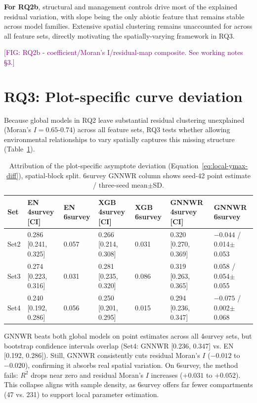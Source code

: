 \documentclass[logo,msc,ai]{infthesis}           %
\newcommand{\fig}[1]{\textcolor{purple}{[FIG: #1]}}
\begin{document}
\textbf{For RQ2b}, structural and management controls drive most of the explained residual variation, with slope being the only abiotic feature that remains stable across model families. Extensive spatial clustering remains unaccounted for across all feature sets, directly motivating the spatially-varying framework in RQ3.

\fig{RQ2b - coefficient/Moran's I/residual-map composite. See working notes \S3.}



\section{RQ3: Plot-specific curve deviation}

Because global models in RQ2 leave substantial residual clustering unexplained (Moran's $I = 0.65\text{-}0.74$) across all feature sets, RQ3 tests whether allowing environmental relationships to vary spatially captures this missing structure (Table~\ref{tab:results-rq3}).

\begin{table}[!htbp]
\centering
\scriptsize
\renewcommand{\arraystretch}{1.2}
\begin{tabular}{lllllll}
\toprule
Set & EN 4survey [CI] & EN 6survey & XGB 4survey [CI] & XGB 6survey & GNNWR 4survey [CI] & GNNWR 6survey \\
\midrule
Set2 & 0.286 [0.241, 0.325] & 0.057 & 0.266 [0.214, 0.308] & 0.031 & 0.320 [0.270, 0.369] & $-0.044$ / 0.014$\pm$0.053 \\
Set3 & 0.274 [0.223, 0.316] & 0.031 & 0.281 [0.235, 0.320] & 0.086 & 0.319 [0.263, 0.365] & 0.058 / 0.054$\pm$0.055 \\
Set4 & 0.240 [0.192, 0.286] & 0.056 & 0.250 [0.201, 0.295] & 0.015 & 0.294 [0.236, 0.347] & $-0.075$ / 0.002$\pm$0.068 \\
\bottomrule
\end{tabular}
\caption{Attribution of the plot-specific asymptote deviation
(Equation~\ref{eq:local-ymax-diff}), spatial-block split. 6survey GNNWR column shows
seed-42 point estimate / three-seed mean$\pm$SD.} %
\label{tab:results-rq3}
\end{table}

GNNWR beats both global models on point estimates across all 4survey sets, but bootstrap confidence intervals overlap (Set4: GNNWR [0.236, 0.347] vs. EN [0.192, 0.286]). Still, GNNWR consistently cuts residual Moran’s $I$ ($-0.012$ to $-0.020$), confirming it absorbs real spatial variation. On 6survey, the method fails: $R^2$ drops near zero and residual Moran’s $I$ increases ($+0.031$ to $+0.052$). This collapse aligns with sample density, as 6survey offers far fewer compartments (47 vs. 231) to support local parameter estimation. 
\end{document}
